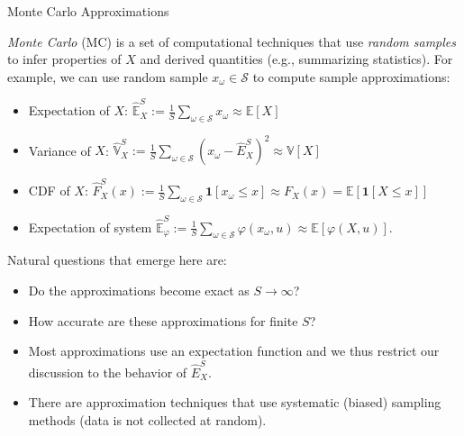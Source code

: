 \documentclass[handout,9pt]{beamer}
\begin{document}
%
\begin{frame}{Monte Carlo Approximations}

{\em Monte Carlo} (MC) is a set of computational techniques that use {\em random samples} to infer properties of $X$ and derived quantities (e.g., summarizing statistics).  For example, we can use random sample $x_\omega \in \mathcal{S}$ to compute sample approximations:
\begin{block}{}
\begin{itemize}
\item Expectation of $X$: $\hat{\mathbb{E}}_X^S:=\frac{1}{S}\sum_{\omega \in \mathcal{S}}x_\omega\approx \mathbb{E}[X]$
\item Variance of $X$: $\hat{\mathbb{V}}_X^S:=\frac{1}{S}\sum_{\omega \in \mathcal{S}}(x_\omega-\hat{E}_X^S)^2\approx \mathbb{V}[X]$
\item CDF of $X$: $\hat{F}_X^S(x):=\frac{1}{S}\sum_{\omega 
\in \mathcal{S}}\mathbf{1}[x_\omega \leq x]\approx F_X(x)=\mathbb{E}[{\mathbf{1}[X \leq x]}]$
\item Expectation of system $\hat{\mathbb{E}}_\varphi^S:=\frac{1}{S}\sum_{\omega 
\in \mathcal{S}}\varphi(x_\omega,u)\approx \mathbb{E}[{\varphi(X,u)}]$. 
\end{itemize}
\end{block}
Natural questions that emerge here are: 
\begin{block}{}
\begin{itemize}
\item Do the approximations become exact as $S\to \infty$?
\item How accurate are these approximations for finite $S$?
\end{itemize}
\end{block}
\begin{itemize}
\item Most approximations use an expectation function and we thus restrict our discussion to the behavior of $\hat{E}_X^S$. 
\item There are approximation techniques that use systematic (biased) sampling methods (data is not collected at random). 
\end{itemize}
\end{frame}
\end{document}
